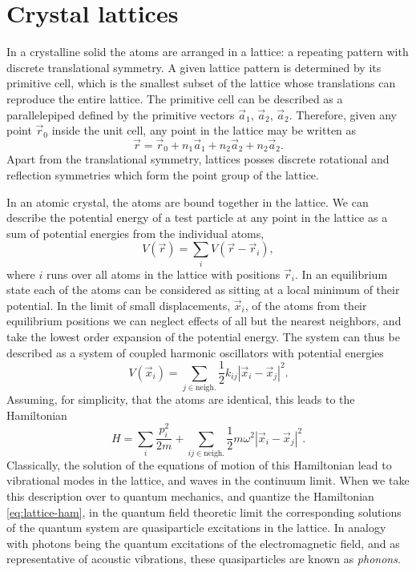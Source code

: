 \section{Crystal lattices}

In a crystalline solid the atoms are arranged in a lattice: a repeating pattern with discrete translational symmetry. A given lattice pattern is determined by its primitive cell, which is the smallest subset of the lattice whose translations can reproduce the entire lattice. The primitive cell can be described as a parallelepiped defined by the primitive vectors $\vec{a}_1$, $\vec{a}_2$, $\vec{a}_2$. Therefore, given any point $\vec{r}_0$ inside the unit cell, any point in the lattice may be written as
\begin{equation}
    \vec{r}=\vec{r}_0+n_1\vec{a}_1+n_2\vec{a}_2+n_2\vec{a}_2.
\end{equation}
Apart from the translational symmetry, lattices posses discrete rotational and reflection symmetries which form the point group of the lattice.

In an atomic crystal, the atoms are bound together in the lattice. We can describe the potential energy of a test particle at any point in the lattice as a sum of potential energies from the individual atoms,
\begin{equation}
    V(\vec{r})=\sum_iV(\vec{r}-\vec{r}_i),
    \label{eq:crystal-atom-pe}
\end{equation}
where $i$ runs over all atoms in the lattice with positions $\vec{r}_i$. In an equilibrium state each of the atoms can be considered as sitting at a local minimum of their potential. In the limit of small displacements, $\vec{x}_i$, of the atoms from their equilibrium positions we can neglect effects of all but the nearest neighbors, and take the lowest order expansion of the potential energy. The system can thus be described as a system of coupled harmonic oscillators with potential energies
\begin{equation}
    V(\vec{x}_i)=\sum_{j\in\text{neigh.}}\frac{1}{2}k_{ij}|\vec{x}_i-\vec{x}_j|^2.
\end{equation}
Assuming, for simplicity, that the atoms are identical, this leads to the Hamiltonian
\begin{equation}
    H=\sum_i\frac{p_i^2}{2m}+\sum_{ij\in\text{neigh.}}\frac{1}{2}m\omega^2|\vec{x}_i-\vec{x}_j|^2.
    \label{eq:lattice-ham}
\end{equation}
Classically, the solution of the equations of motion of this Hamiltonian lead to vibrational modes in the lattice, and waves in the continuum limit. When we take this description over to quantum mechanics, and quantize the Hamiltonian \eqref{eq:lattice-ham}, in the quantum field theoretic limit the corresponding solutions of the quantum system are quasiparticle excitations in the lattice. In analogy with photons being the quantum excitations of the electromagnetic field, and as representative of acoustic vibrations, these quasiparticles are known as \emph{phonons}.

